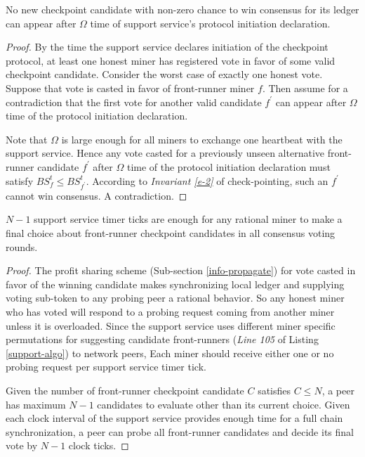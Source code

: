 \begin{lemma}
\label{l-cand-list}
No new checkpoint candidate with non-zero chance to win consensus for its ledger can appear after $\Omega$ time of support service's protocol initiation declaration.     
\end{lemma}
\begin{proof}
By the time the support service declares initiation of the checkpoint protocol, at least one honest miner has registered vote in favor of some valid checkpoint candidate. Consider the worst case of exactly one honest vote. Suppose that vote is casted in favor of front-runner miner $f$. Then assume for a contradiction that the first vote for another valid candidate $f^\prime$ can appear after $\Omega$ time of the protocol initiation declaration. 

Note that $\Omega$ is large enough for all miners to exchange one heartbeat with the support service. Hence any vote casted for a previously unseen alternative front-runner candidate $f^\prime$ after $\Omega$ time of the protocol initiation declaration must satisfy $BS_f^t \leq BS_{f^\prime}^t$. According to \textit{Invariant \ref{e-2}} of check-pointing, such an $f^\prime$ cannot win consensus. A contradiction.  
\end{proof}

\begin{lemma}
\label{l-round-time}
$N - 1$ support service timer ticks are enough for any rational miner to make a final choice about front-runner checkpoint candidates in all consensus voting rounds.   
\end{lemma}
\begin{proof}
The profit sharing scheme (Sub-section \ref{info-propagate}) for vote casted in favor of the winning candidate makes synchronizing local ledger and supplying voting sub-token to any probing peer a rational behavior. So any honest miner who has voted will respond to a probing request coming from another miner unless it is overloaded. Since the support service uses different miner specific permutations for suggesting candidate front-runners (\textit{Line 105} of Listing \ref{support-algo}) to network peers, Each miner should receive either one or no probing request per support service timer tick.

Given the number of front-runner checkpoint candidate $C$ satisfies $C \leq N$, a peer has maximum $N - 1$ candidates to evaluate other than its current choice. Given each clock interval of the support service provides enough time for a full chain synchronization, a peer can probe all front-runner candidates and decide its final vote by $N - 1$ clock ticks.         
\end{proof}

